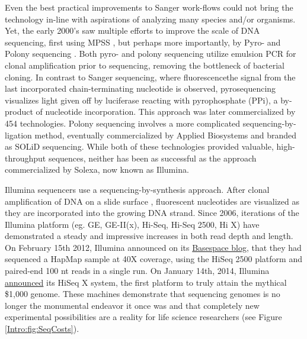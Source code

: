     Even the best practical improvements to Sanger work-flows could not bring the technology in-line with aspirations of analyzing many species and/or organisms. Yet, the early 2000’s saw multiple efforts to improve the scale of DNA sequencing, first using MPSS \citep{Brenner2000a}, but perhaps more importantly, by Pyro- \citep{Ronaghi1998a} and Polony sequencing \citep{Shendure2005}. Both pyro- and polony sequencing utilize emulsion PCR \citep{Nakano2003a} for clonal amplification prior to sequencing, removing the bottleneck of bacterial cloning. In contrast to Sanger sequencing, where fluorescencethe signal from the last incorporated chain-terminating nucleotide is observed, pyrosequencing visualizes light given off by luciferase reacting with pyrophosphate (PPi), a by-product of nucleotide incorporation. This approach was later commercialized by 454 technologies. Polony sequencing involves a more complicated sequencing-by-ligation method, eventually commercialized by Applied Biosystems and branded as SOLiD sequencing. While both of these technologies provided valuable, high-throughput sequences, neither has been as successful as the approach commercialized by Solexa, now known as Illumina.

    Illumina sequencers use a sequencing-by-synthesis approach. After clonal amplification of DNA on a slide surface \citep{Bentley2008}, fluorescent nucleotides are visualized as they are incorporated into the growing DNA strand. Since 2006, iterations of the Illumina platform (eg. GE, GE-II(x), Hi-Seq, Hi-Seq 2500, Hi X) have demonstrated a steady and impressive increases in both read depth and length. On February 15th 2012, Illumina announced on its \href{http://blog.basespace.illumina.com/}{Basespace blog}, that they had sequenced a HapMap sample at 40X coverage, using the HiSeq 2500 platform and paired-end 100 nt reads in a single run. On January 14th, 2014, Illumina \href{http://bit.ly/PZpegZ}{announced} its HiSeq X system, the first platform to truly attain the mythical \$1,000 genome. These machines demonstrate that sequencing genomes is no longer the monumental endeavor it once was and that completely new experimental possibilities are a reality for life science researchers (see Figure \ref{Intro:fig:SeqCosts}).

